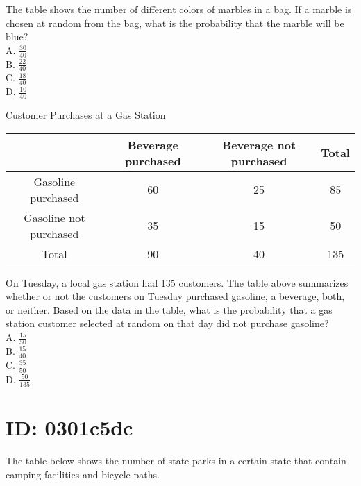 The table shows the number of different colors of marbles in a bag. If a marble is chosen at random from the bag, what is the probability that the marble will be blue?\\
A. $\frac{30}{40}$\\
B. $\frac{22}{40}$\\
C. $\frac{18}{40}$\\
D. $\frac{10}{40}$

Customer Purchases at a Gas Station

\begin{center}
\begin{tabular}{|c|c|c|c|}
\hline
 & Beverage purchased & Beverage not purchased & Total \\
\hline
Gasoline purchased & 60 & 25 & 85 \\
\hline
Gasoline not purchased & 35 & 15 & 50 \\
\hline
Total & 90 & 40 & 135 \\
\hline
\end{tabular}
\end{center}

On Tuesday, a local gas station had 135 customers. The table above summarizes whether or not the customers on Tuesday purchased gasoline, a beverage, both, or neither. Based on the data in the table, what is the probability that a gas station customer selected at random on that day did not purchase gasoline?\\
A. $\frac{15}{50}$\\
B. $\frac{15}{40}$\\
C. $\frac{35}{50}$\\
D. $\frac{50}{135}$

































\section*{ID: 0301c5dc}
The table below shows the number of state parks in a certain state that contain camping facilities and bicycle paths.


